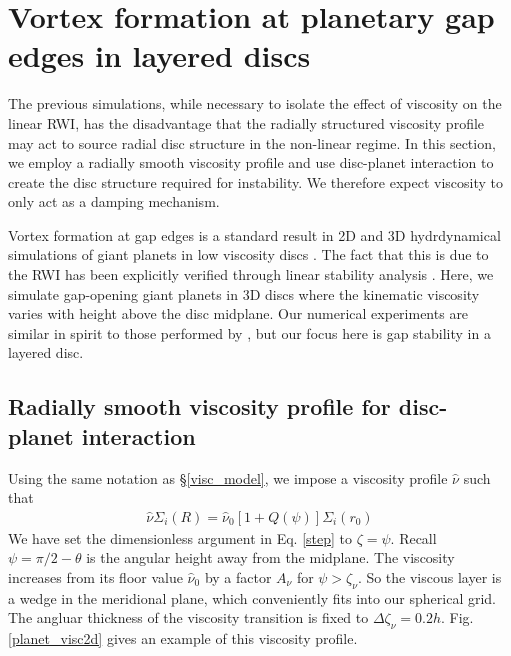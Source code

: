 \section{Vortex formation at planetary gap edges in layered
  discs}\label{disc-planet} 
The previous simulations, while necessary to isolate the effect of 
viscosity on the linear RWI, has the disadvantage that the radially
structured viscosity profile may act to source radial disc structure
in the non-linear regime. In this section, we employ a radially smooth
viscosity profile and use 
disc-planet interaction to
create the disc structure required for instability. We therefore expect viscosity to only
act as a damping mechanism. 

Vortex formation at gap edges is a standard result in 
2D and 3D hydrdynamical simulations of giant planets in low viscosity discs 
\citep{valborro07,lin10,lin11a,lin12}. The fact that this is due to
the RWI has been explicitly verified through linear stability
analysis %
\citep{valborro07,lin10}. Here, we simulate gap-opening giant planets
in 3D discs where the kinematic viscosity varies with height above the
disc midplane. Our numerical experiments are similar in spirit to
those performed by \cite{pierens10}, but our focus here is gap
stability in a layered disc. 
 
\subsection{Radially smooth viscosity profile for disc-planet
  interaction}\label{planet_visc_mode} 
Using the same notation as \S\ref{visc_model}, we impose a viscosity
profile $\hat{\nu}$ such that 
\begin{align}\label{planet_visc_profile}
  \hat{\nu}\Sigma_i(R)=
  \hat{\nu}_0\left[1+Q(\psi)\right]\Sigma_i(r_0)   
\end{align}
We have set the dimensionless argument in Eq. \ref{step} to
$\zeta=\psi$. Recall $\psi=\pi/2-\theta$ is the angular height away from the midplane. 
The viscosity increases from its floor value $\hat{\nu}_0$ by a factor
$A_\nu$ for $\psi > \zeta_\nu$. So the viscous layer is 
a wedge in the meridional plane, which conveniently fits into our
spherical grid. %
The angluar thickness of the viscosity
transition is fixed to $\Delta\zeta_\nu =
0.2h$. Fig. \ref{planet_visc2d} gives an example of this  
viscosity profile. 

